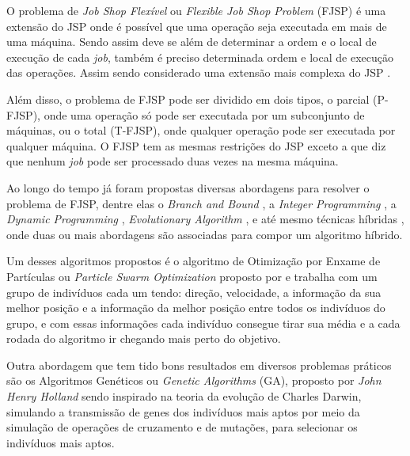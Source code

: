     O problema de \textit{Job Shop Flexível} ou \textit{Flexible Job Shop Problem} (FJSP) é uma extensão do JSP onde é possível que uma operação seja executada em mais de uma máquina. Sendo assim deve se além de determinar a ordem e o local de execução de cada \textit{job}, também é preciso determinada ordem e local de execução das operações. Assim sendo considerado uma extensão mais complexa do JSP \cite{Jansen2000}.\hfill\vspace{\onelineskip}

    Além disso, o problema de FJSP pode ser dividido em dois tipos, o parcial (P-FJSP), onde uma operação só pode ser executada por um subconjunto de máquinas, ou o total (T-FJSP), onde qualquer operação pode ser executada por qualquer máquina. O FJSP tem as mesmas restrições do JSP exceto a que diz que nenhum \textit{job} pode ser processado duas vezes na mesma máquina.\hfill\vspace{\onelineskip}

    Ao longo do tempo já foram propostas diversas abordagens para resolver o problema de FJSP, dentre elas o \textit{Branch and Bound} \cite{Nababan2008}, a 
    \textit{Integer Programming} \cite{Pan2007}, a 
    \textit{Dynamic Programming} \cite{Gromicho2012}, 
    \textit{Evolutionary Algorithm} \cite{Pezzella2008}, e até mesmo técnicas híbridas \cite{Zhang2009}, onde duas ou mais abordagens são associadas para compor um algoritmo híbrido.\hfill\vspace{\onelineskip}

    Um desses algoritmos propostos é o algoritmo de Otimização por Enxame de Partículas ou \textit{Particle Swarm Optimization} proposto por \cite{Kennedy1995} e trabalha com um grupo de indivíduos cada um tendo: direção, velocidade, a informação da sua melhor posição e a informação da melhor posição entre todos os indivíduos do grupo, e com essas informações cada indivíduo consegue tirar sua média e a cada rodada do algoritmo ir chegando mais perto do objetivo.\hfill\vspace{\onelineskip}

    Outra abordagem que tem tido bons resultados em diversos problemas práticos \cite{Qing2012} são os Algoritmos Genéticos ou \textit{Genetic Algorithms} (GA), proposto por \textit{John Henry Holland} sendo inspirado na teoria da evolução de Charles Darwin, simulando a transmissão de genes dos indivíduos mais aptos por meio da simulação de operações de cruzamento e de mutações, para selecionar os indivíduos mais aptos.\hfill\vspace{\onelineskip}

